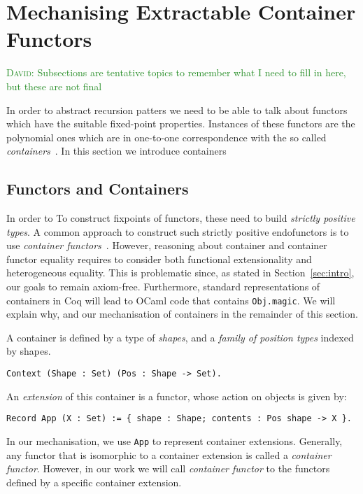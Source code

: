 \documentclass[a4paper, UKenglish, cleveref, autoref, thm-restate]{lipics-v2021}
\newcommand{\dcas}[1]{\textcolor{ForestGreen}{\textsc{David}: #1}}
\newcommand{\R}{\mathbb{R}}
\newcommand{\operator}[1]{\textsf{#1}}
\begin{document}

\section{Mechanising Extractable Container Functors}
\dcas{Subsections are tentative topics to remember what I need to fill in here,
but these are not final}

In order to abstract recursion patters we need to be able to talk about functors
which have the suitable fixed-point properties. Instances of these functors are
the polynomial ones which are in one-to-one correspondence with the so called
\emph{containers}~\cite{AbbottAG05}.
In this section we introduce containers

\subsection{Functors and Containers}
\label{sec:containers}
In order to To construct fixpoints of functors, these need to build
\emph{strictly positive types}. A common approach to construct such strictly
positive endofunctors is to use \emph{container functors}~\cite{AbbottAG05}.
However, reasoning about container and container functor equality requires to
consider both functional extensionality and heterogeneous equality. This is
problematic since, as stated in Section~\ref{sec:intro}, our goals to remain
axiom-free.  Furthermore, standard representations of containers in Coq will
lead to OCaml code that contains \texttt{Obj.magic}. We will explain
why, and our mechanisation of containers in the remainder of this section.

A container is defined by a type of \emph{shapes}, and a \emph{family of
position types} indexed by shapes.
\begin{verbatim}
Context (Shape : Set) (Pos : Shape -> Set).
\end{verbatim}
An \emph{extension} of this container is a functor, whose action on objects is
given by:
\begin{verbatim}
Record App (X : Set) := { shape : Shape; contents : Pos shape -> X }.
\end{verbatim}
In our mechanisation, we use \texttt{App} to represent container
extensions.  Generally, any functor that is isomorphic to a container extension
is called a \emph{container functor}. However, in our work we will call
\emph{container functor} to the functors defined by a specific container
extension.
\end{document}
